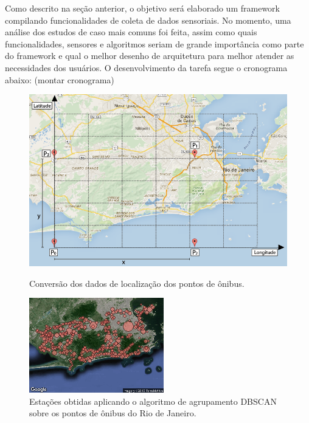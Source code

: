 \documentclass[12pt]{report} %
\begin{document}
Como descrito na seção anterior, o objetivo será elaborado um framework compilando funcionalidades de coleta de dados sensoriais. No momento, uma análise dos estudos de caso mais comuns foi feita, assim como quais funcionalidades, sensores e algoritmos seriam de grande importância como parte do framework e qual o melhor desenho de arquitetura para melhor atender as necessidades dos usuários. O desenvolvimento da tarefa segue o cronograma abaixo: (montar cronograma)

\begin{figure}[!ht]
	\centering
	\begin{minipage}[t]{0.49\textwidth}
		\includegraphics[width=\textwidth]{conversao.png}
		\caption
		{
			Conversão dos dados de localização dos pontos de ônibus.
		}
		\label{fig:conversao}
	\end{minipage}
	\hfill
	\begin{minipage}[t]{0.47\textwidth}
		\includegraphics[width=\textwidth]{stations-v3.png}
		\caption
		{
			Estações obtidas aplicando o algoritmo de agrupamento DBSCAN sobre os pontos de ônibus do Rio de Janeiro.
		}
		\label{fig:stacoes}
	\end{minipage}	
\end{figure}
\end{document}
